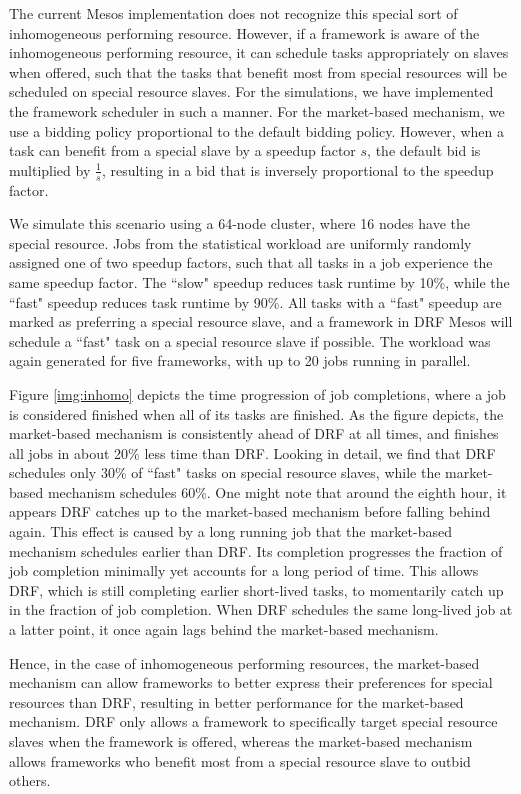 \documentclass{acm_proc_article-sp}
\begin{document}
The current Mesos implementation does not recognize this special sort of inhomogeneous performing resource. However, if a framework is aware of the inhomogeneous performing resource, it can schedule tasks appropriately on slaves when offered, such that the tasks that benefit most from special resources will be scheduled on special resource slaves. For the simulations, we have implemented the framework scheduler in such a manner. For the market-based mechanism, we use a bidding policy proportional to the default bidding policy. However, when a task can benefit from a special slave by a speedup factor $s$, the default bid is multiplied by $\frac{1}{s}$, resulting in a bid that is inversely proportional to the speedup factor.

We simulate this scenario using a 64-node cluster, where 16 nodes have the special resource. Jobs from the statistical workload are uniformly randomly assigned one of two speedup factors, such that all tasks in a job experience the same speedup factor. The ``slow" speedup reduces task runtime by 10\%, while the ``fast" speedup reduces task runtime by 90\%. All tasks with a ``fast" speedup are marked as preferring a special resource slave, and a framework in DRF Mesos will schedule a ``fast" task on a special resource slave if possible. The workload was again generated for five frameworks, with up to 20 jobs running in parallel.

Figure \ref{img:inhomo} depicts the time progression of job completions, where a job is considered finished when all of its tasks are finished. As the figure depicts, the market-based mechanism is consistently ahead of DRF at all times, and finishes all jobs in about 20\% less time than DRF. Looking in detail, we find that DRF schedules only 30\% of ``fast" tasks on special resource slaves, while the market-based mechanism schedules 60\%. One might note that around the eighth hour, it appears DRF catches up to the market-based mechanism before falling behind again. This effect is caused by a long running job that the market-based mechanism schedules earlier than DRF. Its completion progresses the fraction of job completion minimally yet accounts for a long period of time. This allows DRF, which is still completing earlier short-lived tasks, to momentarily catch up in the fraction of job completion. When DRF schedules the same long-lived job at a latter point, it once again lags behind the market-based mechanism.

Hence, in the case of inhomogeneous performing resources, the market-based mechanism can allow frameworks to better express their preferences for special resources than DRF, resulting in better performance for the market-based mechanism. DRF only allows a framework to specifically target special resource slaves when the framework is offered, whereas the market-based mechanism allows frameworks who benefit most from a special resource slave to outbid others.
\end{document}
